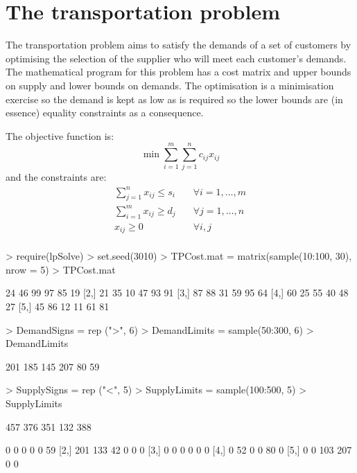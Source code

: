\section{The transportation problem}

The transportation problem aims to satisfy the demands of a set of customers by optimising the selection of the supplier who will meet each customer's demands. The mathematical program for this problem has a cost matrix and upper bounds on supply and lower bounds on demands. The optimisation is a minimisation exercise so the demand is kept as low as is required so the lower bounds are (in essence) equality constraints as a consequence.

The objective function is:\begin{equation}\label{OperResTransObj}
\min{ \sum_{i=1}^m{ \sum_{j=1}^n{
c_{ij}x_{ij}
}}}\end{equation}
and the constraints are:
\begin{eqnarray*} \sum_{j=1}^n { x_{ij}} \le s_i& \quad \forall i=1,\ldots,m\\
\sum_{i=1}^m { x_{ij}} \ge d_j& \quad \forall j=1,\ldots,n\\
x_{ij} \ge 0& \quad \forall i,j\\
\end{eqnarray*} 
\begin{Schunk}
\begin{Sinput}
> require(lpSolve)
> set.seed(3010)
> TPCost.mat = matrix(sample(10:100, 30), nrow = 5)
> TPCost.mat
\end{Sinput}
\begin{Soutput}
     [,1] [,2] [,3] [,4] [,5] [,6]
[1,]   24   46   99   97   85   19
[2,]   21   35   10   47   93   91
[3,]   87   88   31   59   95   64
[4,]   60   25   55   40   48   27
[5,]   45   86   12   11   61   81
\end{Soutput}
\begin{Sinput}
> DemandSigns = rep (">", 6)
> DemandLimits = sample(50:300, 6)
> DemandLimits
\end{Sinput}
\begin{Soutput}
[1] 201 185 145 207  80  59
\end{Soutput}
\begin{Sinput}
> SupplySigns = rep ("<", 5)
> SupplyLimits = sample(100:500, 5)
> SupplyLimits
\end{Sinput}
\begin{Soutput}
[1] 457 376 351 132 388
\end{Soutput}
\begin{Soutput}
     [,1] [,2] [,3] [,4] [,5] [,6]
[1,]    0    0    0    0    0   59
[2,]  201  133   42    0    0    0
[3,]    0    0    0    0    0    0
[4,]    0   52    0    0   80    0
[5,]    0    0  103  207    0    0
\end{Soutput}
\end{Schunk}


